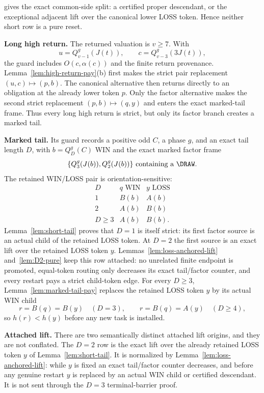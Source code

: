 gives the exact common-side split: a certified proper descendant, or the
exceptional adjacent lift over the canonical lower LOSS token.  Hence neither
short row is a pure reset.

\item \textbf{Long high return.}  The returned valuation is $v\ge7$.  With
\[
 u=Q_{v-1}^g(J(t)),\qquad c=Q_{v-3}^g(3J(t)),
\]
the guard includes $O(c,\alpha(c))$ and the finite return provenance.
Lemma~\ref{lem:high-return-pay}(b) first makes the strict pair replacement
$(u,c)\mapsto(p,b)$.  The canonical alternative then returns directly to an
obligation at the already lower token $p$.  Only the factor alternative makes
the second strict replacement $(p,b)\mapsto(q,y)$ and enters the exact
marked-tail frame. Thus every long high return is strict, but only its factor
branch creates a marked tail.

\item \textbf{Marked tail.}  Its guard records a positive odd $C$, a phase $g$,
and an exact tail length $D$, with $b=Q_D^g(C)$ WIN and the exact marked
factor frame
\[
 \{Q_3^g(J(b)),Q_2^g(J(b))\}\text{ containing a \DRAW}.
\]
The retained WIN/LOSS pair is orientation-sensitive:
\[
\begin{array}{c|cc}
D&q\text{ WIN}&y\text{ LOSS}\\ \hline
1&B(b)&A(b)\\
2&A(b)&B(b)\\
D\ge3&A(b)&B(b).
\end{array}
\]
Lemma~\ref{lem:short-tail} proves that $D=1$ is itself strict: its first
factor source is an actual child of the retained LOSS token.  At $D=2$ the first source is an exact lift over the retained LOSS token
$y$. Lemmas~\ref{lem:loss-anchored-lift} and~\ref{lem:D2-pure} keep this
row attached: no unrelated finite endpoint is promoted, equal-token routing
only decreases its exact tail/factor counter, and every restart pays a strict
child-token edge.  For every $D\ge3$,
Lemma~\ref{lem:marked-tail-pay} replaces the retained LOSS token $y$ by its
actual WIN child
\[
 r=B(q)=B(y)\quad(D=3),\qquad
 r=B(q)=A(y)\quad(D\ge4),
\]
so $h(r)<h(y)$ before any new task is installed.

\item \textbf{Attached lift.}  There are two semantically distinct attached
lift origins, and they are not conflated.  The $D=2$ row is the exact lift over the already retained LOSS token $y$ of
Lemma~\ref{lem:short-tail}. It is normalized by
Lemma~\ref{lem:loss-anchored-lift}: while $y$ is fixed an exact tail/factor
counter decreases, and before any genuine restart $y$ is replaced by an
actual WIN child or certified descendant. It is not sent through the $D=3$
terminal-barrier proof.

